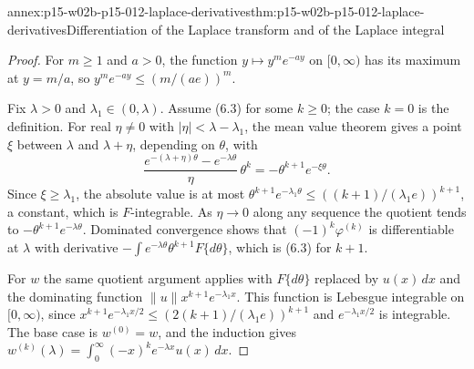 \begin{annexitem}{annex:p15-w02b-p15-012-laplace-derivatives}{thm:p15-w02b-p15-012-laplace-derivatives}{Differentiation of the Laplace transform and of the Laplace integral}
\begin{proof}
For \(m\geq1\) and \(a>0\), the function \(y\mapsto y^me^{-ay}\) on
\([0,\infty)\) has its maximum at \(y=m/a\), so
\(y^me^{-ay}\leq(m/(ae))^m\).

Fix \(\lambda>0\) and \(\lambda_1\in(0,\lambda)\). Assume (6.3) for some
\(k\geq0\); the case \(k=0\) is the definition. For real \(\eta\neq0\) with
\(|\eta|<\lambda-\lambda_1\), the mean value theorem gives a point \(\xi\)
between \(\lambda\) and \(\lambda+\eta\), depending on \(\theta\), with
\[
 \frac{e^{-(\lambda+\eta)\theta}-e^{-\lambda\theta}}\eta\,\theta^k
   =-\theta^{k+1}e^{-\xi\theta}.
\]
Since \(\xi\geq\lambda_1\), the absolute value is at most
\(\theta^{k+1}e^{-\lambda_1\theta}\leq((k+1)/(\lambda_1e))^{k+1}\), a
constant, which is \(F\)-integrable. As \(\eta\to0\) along any sequence the
quotient tends to \(-\theta^{k+1}e^{-\lambda\theta}\). Dominated convergence
shows that \((-1)^k\varphi^{(k)}\) is differentiable at \(\lambda\) with
derivative \(-\int e^{-\lambda\theta}\theta^{k+1}F\{d\theta\}\), which is
(6.3) for \(k+1\).

For \(w\) the same quotient argument applies with \(F\{d\theta\}\) replaced
by \(u(x)\,dx\) and the dominating function
\(\|u\|x^{k+1}e^{-\lambda_1x}\). This function is Lebesgue integrable on
\([0,\infty)\), since \(x^{k+1}e^{-\lambda_1x/2}\leq(2(k+1)/(\lambda_1e))^{k+1}\)
and \(e^{-\lambda_1x/2}\) is integrable. The base case is
\(w^{(0)}=w\), and the induction gives
\(w^{(k)}(\lambda)=\int_0^\infty(-x)^ke^{-\lambda x}u(x)\,dx\).
\end{proof}
\end{annexitem}

